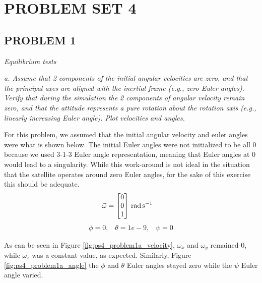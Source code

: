 \section{\Large PROBLEM SET 4}
\subsection{PROBLEM 1}
\textit{Equilibrium tests}

\textit{a. Assume that 2 components of the initial angular velocities are zero, and that the principal axes are aligned with the inertial frame (e.g., zero Euler angles). Verify that during the simulation the 2 components of angular velocity remain zero, and that the attitude represents a pure rotation about the rotation axis (e.g., linearly increasing Euler angle). Plot velocities and angles.}

For this problem, we assumed that the initial angular velocity and euler angles were what is shown below. The initial Euler angles were not initialized to be all 0 because we used 3-1-3 Euler angle representation, meaning that Euler angles at 0 would lead to a singularity. While this work-around is not ideal in the situation that the satellite operates around zero Euler angles, for the sake of this exercise this should be adequate.
\begin{align*}
\Vec{\omega} &= 
\qty[parse-numbers = false]{
    \begin{bmatrix}
    0 \\
    0 \\
    1 \\ 
    \end{bmatrix}
}{\radian\per\s}
\end{align*}
\begin{align*}
\phi = 0, \;\;\;
\theta = 1e-9, \;\;\;
\psi = 0
\end{align*}

As can be seen in Figure \ref{fig:ps4_problem1a_velocity}, $\omega_x$ and $\omega_y$ remained 0, while $\omega_z$ was a constant value, as expected. Similarly, Figure \ref{fig:ps4_problem1a_angle} the $\phi$ and $\theta$ Euler angles stayed zero while the $\psi$ Euler angle varied. 

